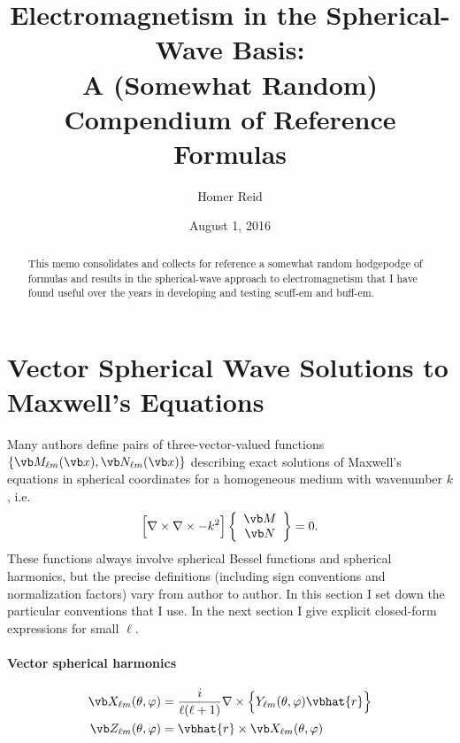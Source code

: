 \documentclass[letterpaper]{article}
\title {Electromagnetism in the Spherical-Wave Basis: \\
        {\large A (Somewhat Random) Compendium of Reference Formulas}
       }
\author {Homer Reid}
\date {August 1, 2016}
\newcommand{\lm}{_{\ell m}}
\begin{document}
\pagestyle{myheadings}
\maketitle

\begin{abstract}
This memo consolidates and collects for reference
a somewhat random hodgepodge of formulas and results
in the spherical-wave approach to electromagnetism
that I have found useful over the years in developing
and testing {\sc scuff-em} and {\sc buff-em}.
\end{abstract}

\tableofcontents

\newpage
\section{Vector Spherical Wave Solutions to Maxwell's Equations}
\label{SphericalWaveSection}

Many authors define pairs of three-vector-valued functions
$\{\vb M_{\ell m}(\vb x), \vb N_{\ell m}(\vb x)\}$
describing exact solutions of Maxwell's equations 
in spherical coordinates for 
a homogeneous medium with wavenumber $k$, i.e.
$$\Big[\nabla \times \nabla \times - k^2 \Big]
  \left\{\begin{array}{c} \vb M \\ \vb N\end{array}\right\} = 0.$$
These functions always involve spherical Bessel functions and
spherical harmonics, but the precise definitions (including
sign conventions and normalization factors) vary from author
to author. In this section I set down the particular
conventions that I use. In the next section I give
explicit closed-form expressions for small $\ell$.

\paragraph{Vector spherical harmonics}
\begin{align*}
  \vb X\lm(\theta, \varphi) 
&= \frac{i}{\ell(\ell+1)}\nabla \times 
     \Big\{Y\lm(\theta, \varphi) \vbhat{r}\Big\}
\\
  \vb Z\lm(\theta, \varphi) &= \vbhat{r} \times \vb X\lm(\theta, \varphi)
\end{align*}
\end{document}
